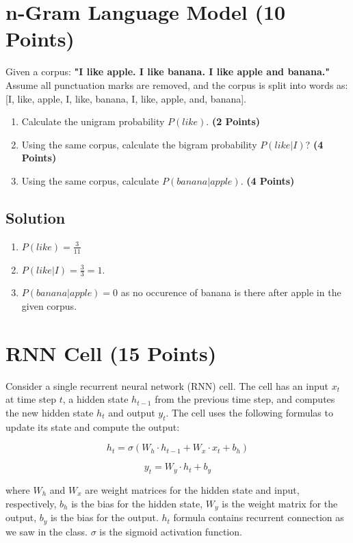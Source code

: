 \documentclass[12pt, xcolor=dvipsnames,svgnames,x11names]{article}
\begin{document}
\section{n-Gram Language Model (10 Points)}

Given a corpus: \textbf{"I like apple. I like banana. I like apple and banana."} Assume all punctuation marks are removed, and the corpus is split into words as: [I, like, apple, I, like, banana, I, like, apple, and, banana]. 

\begin{enumerate}
\item 
Calculate the unigram probability $P(like)$. \hfill \textbf{(2 Points)}
\item Using the same corpus, calculate the bigram probability $P(like | I)$?  \hfill \textbf{(4 Points)}
\item Using the same corpus, calculate $P(banana | apple)$.  \hfill \textbf{(4 Points)}
\end{enumerate} 

\subsection{Solution}

\begin{enumerate}
\item $P(like) = \frac{3}{11}$
\item $P(like | I) = \frac{3}{3} = 1$.
\item $P(banana | apple)  = 0$ as no occurence of banana is there after apple in the given corpus.
\end{enumerate}


\section{RNN Cell \hfill (15 Points)}
Consider a single recurrent neural network (RNN) cell. The cell has an input $x_t$ at time step $t$, a hidden state $h_{t-1}$ from the previous time step, and computes the new hidden state $h_t$ and output $y_t$. The cell uses the following formulas to update its state and compute the output:

$$
h_t = \sigma(W_h \cdot h_{t-1} + W_x \cdot x_t + b_h) $$

$$y_t = W_y \cdot h_t + b_y$$

where $W_h$ and $W_x$ are weight matrices for the hidden state and input, respectively, $b_h$ is the bias for the hidden state, $W_y$ is the weight matrix for the output, $b_y$ is the bias for the output. $h_t$ formula contains recurrent connection as we saw in the class. $\sigma$ is the sigmoid activation function.
\end{document}
